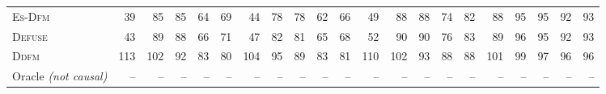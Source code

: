 \begin{tabular}{lrrrrrrrrrrrrrrrrrrrr}
\quad \textsc{Es-Dfm} & 39 & 85 & 85 & 64 & 69 & 44 & 78 & 78 & 62 & 66 & 49 & 88 & 88 & 74 & 82 & 88 & 95 & 95 & 92 & 93\\
\quad \textsc{Defuse} & 43 & 89 & 88 & 66 & 71 & 47 & 82 & 81 & 65 & 68 & 52 & 90 & 90 & 76 & 83 & 89 & 96 & 95 & 92 & 93\\
\quad \textsc{Ddfm} & 113 & 102 & 92 & 83 & 80 & 104 & 95 & 89 & 83 & 81 & 110 & 102 & 93 & 88 & 88 & 101 & 99 & 97 & 96 & 96\\
\midrule
\quad Oracle \emph{(not causal)} & -- & -- & -- & -- & -- & -- & -- & -- & -- & -- & -- & -- & -- & -- & -- & -- & -- & -- & -- & --\\
\bottomrule
\end{tabular}
